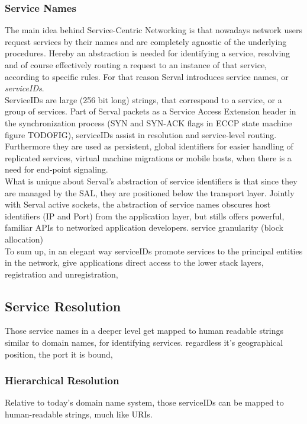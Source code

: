 \subsubsection{Service Names}
The main idea behind Service-Centric Networking is that nowadays network users request services by their names and are completely agnostic of the underlying procedures.
Hereby an abstraction is needed for identifying a service, resolving and of course effectively routing a request to an instance of that service, according to specific rules.
For that reason Serval introduces service names, or \emph{serviceIDs}.\\
\indent ServiceIDs are large (256 bit long) strings, that correspond to a service, or a group of services.
Part of Serval packets as a Service Access Extension header in the synchronization process (SYN and SYN-ACK flags in ECCP state machine figure TODOFIG), serviceIDs assist in resolution and service-level routing.
Furthermore they are used as persistent, global identifiers for easier handling of replicated services, virtual machine migrations or mobile hosts, when there is a need for end-point signaling.\\
\indent What is unique about Serval's abstraction of service identifiers is that since they are managed by the SAL, they are positioned below the transport layer.
Jointly with Serval active sockets, the abstraction of service names obscures host identifiers (IP and Port) from the application layer, but stills offers powerful, familiar APIs to networked application developers.
\indent service granularity (block allocation) \\
\indent To sum up, in an elegant way serviceIDs promote services to the principal entities in the network, give applications direct access to the lower stack layers, registration and unregistration, 



\subsection{Service Resolution}
Those service names in a deeper level get mapped to 
human readable strings similar to domain names, for identifying services.
regardless it's geographical position, the port it is bound, 



\subsubsection{Hierarchical Resolution}
Relative to today's domain name system, those serviceIDs can be mapped to human-readable strings, much like URIs.



